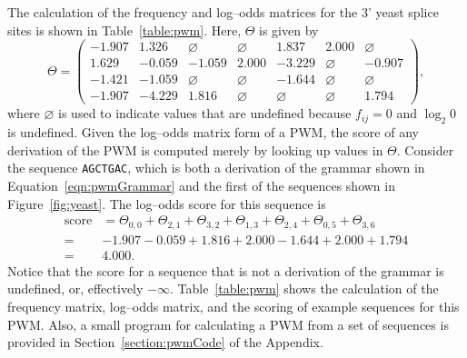     The calculation of the frequency and log--odds matrices for the
    3' yeast splice sites is shown in Table~\ref{table:pwm}.  Here,
    $\Theta$ is given by
    \begin{equation}\label{eqn: theta2}
    \Theta =
        \begin{pmatrix}
-1.907 & 1.326 & \varnothing & \varnothing & 1.837 & 2.000 & \varnothing \\
1.629 & -0.059 & -1.059 & 2.000 & -3.229 & \varnothing & -0.907 \\
-1.421 & -1.059 & \varnothing & \varnothing & -1.644 & \varnothing & \varnothing \\
-1.907 & -4.229 & 1.816 & \varnothing & \varnothing &
\varnothing & 1.794
        \end{pmatrix},
    \end{equation}
    where $\varnothing$ is used to indicate values that are
    undefined because $f_{ij}=0$ and $\log_2 0$ is undefined.
    Given
    the log--odds matrix form of a PWM, the score of any derivation
    of the PWM is computed merely by looking up values in $\Theta$.
    Consider the sequence \texttt{AGCTGAC}, which is both a
    derivation of the grammar shown in Equation~\vref{eqn:pwmGrammar}
    and the first of the sequences shown in Figure~\vref{fig:yeast}.
    The log--odds score for this sequence is
    \begin{equation}\label{eqn:score}
        \begin{split}
          \text{score} &= \Theta_{0,0} + \Theta_{2,1}+ \Theta_{3,2}
                    + \Theta_{1,3}+ \Theta_{2,4}+ \Theta_{0,5}+ \Theta_{3,6}\\
            =& -1.907 -0.059 +1.816 +2.000 -1.644 +2.000 +1.794\\
            =& 4.000.
        \end{split}
    \end{equation}
    Notice that the score for a sequence that is not a derivation of
    the grammar is undefined, or, effectively $-\infty$.
    Table~\vref{table:pwm} shows the calculation of the frequency
    matrix, log--odds matrix, and the scoring of example sequences
    for this PWM\@.  Also, a small program for calculating a
    PWM from a set of sequences is provided in
    Section~\vref{section:pwmCode} of the Appendix.


        

